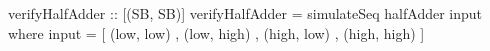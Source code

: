 \begin{haskellcode}
    verifyHalfAdder :: [(SB, SB)]
    verifyHalfAdder = simulateSeq halfAdder input
        where
            input = [ (low,  low)
                    , (low,  high)
                    , (high, low)
                    , (high, high)
                    ]
\end{haskellcode}
